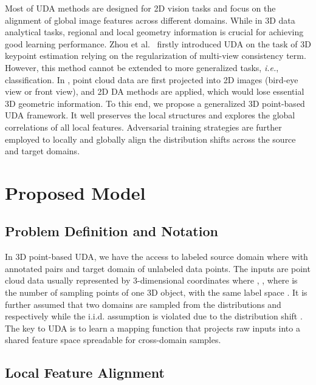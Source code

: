 \documentclass{article}
\newcommand*\ie{\textit{i.e.}}
\begin{document}
Most of UDA methods are designed for 2D vision tasks and focus on the alignment of global image features across different domains. While in 3D data analytical tasks, regional and local geometry information is crucial for achieving good learning performance. Zhou et al.~\cite{zhou2018unsupervised} firstly introduced UDA on the task of 3D keypoint estimation relying on the regularization of multi-view consistency term. However, this method cannot be extended to more generalized tasks, \ie, classification. In \cite{saleh2019domain, wu2019squeezesegv2}, point cloud data are first projected into 2D images (bird-eye view or front view), and 2D DA methods are applied, which would lose essential 3D geometric information.  To this end, we propose a generalized 3D point-based UDA framework. It well preserves the local structures and explores the global correlations of all local features. Adversarial training strategies are further employed to locally and globally align the distribution shifts across the source and target domains.


\section{Proposed Model}

\subsection{Problem Definition and Notation}

In 3D point-based UDA, we have the access to labeled source domain  where  with  annotated pairs and target domain  of  unlabeled data points. The inputs are point cloud data usually represented by 3-dimensional coordinates  where , , where  is the number of sampling points of one 3D object, with the same label space . It is further assumed that two domains are sampled from the distributions  and  respectively while the i.i.d. assumption is violated due to the distribution shift . The key to UDA is to learn a mapping function  that projects raw inputs into a shared feature space  spreadable for cross-domain samples.










\subsection{Local Feature Alignment}
\end{document}
